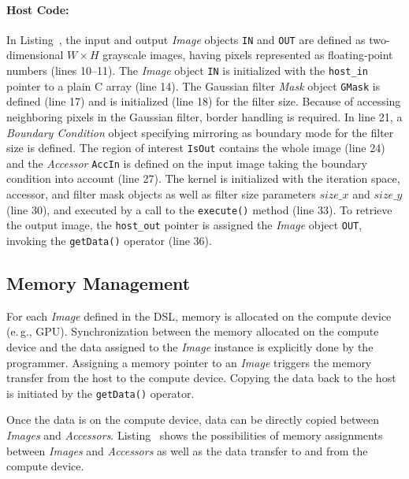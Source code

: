 \paragraph{Host Code:}
In Listing~, the input and output {\em Image} objects {\tt IN} and {\tt OUT} are defined as two-dimensional $W \times H$ grayscale images, having pixels represented as floating-point numbers (lines 10--11). The {\em Image} object {\tt IN} is initialized with the {\tt host\_in} pointer to a plain C array (line 14). The Gaussian filter {\em Mask} object {\tt GMask} is defined (line 17) and is initialized (line 18) for the filter size. Because of accessing neighboring pixels in the Gaussian filter, border handling is required. In line 21, a {\em Boundary Condition} object specifying mirroring as boundary mode for the filter size is defined. The region of interest {\tt IsOut} contains the whole image (line 24) and the {\em Accessor} {\tt AccIn} is defined on the input image taking the boundary condition into account (line 27). The kernel is initialized with the iteration space, accessor, and filter mask objects as well as filter size parameters $size\_x$ and $size\_y$ (line 30), and executed by a call to the {\tt execute()} method (line 33). To retrieve the output image, the {\tt host\_out} pointer is assigned the {\em Image} object {\tt OUT}, invoking the {\tt getData()} operator (line 36).


%
%
\subsection{Memory Management}\label{sec:memory:management}
For each {\em Image} defined in the \ac{DSL}, memory is allocated on the compute device (e.\,g., GPU). Synchronization between the memory allocated on the compute device and the data assigned to the {\em Image} instance is explicitly done by the programmer. Assigning a memory pointer to an {\em Image} triggers the memory transfer from the host to the compute device. Copying the data back to the host is initiated by the {\tt getData()} operator.

Once the data is on the compute device, data can be directly copied between {\em Images} and {\em Accessors}. Listing~ shows the possibilities of memory assignments between {\em Images} and {\em Accessors} as well as the data transfer to and from the compute device.


